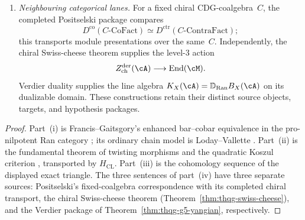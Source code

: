 \begin{proposition}
\begin{enumerate}[label=\textup{(\roman*)}]
\item \emph{Neighbouring categorical lanes.}
 For a fixed chiral CDG-coalgebra~$C$, the completed Positselski
 package compares
 \[
 D^{\mathrm{co}}(C\text{-}\mathrm{CoFact})
 \simeq D^{\mathrm{ctr}}(C\text{-}\mathrm{ContraFact});
 \]
 this transports module presentations over the same~$C$.
 Independently, the chiral Swiss-cheese theorem supplies the
 level-$3$ action
 \[
 Z^{\mathrm{der}}_{\mathrm{ch}}(\cA)
 \longrightarrow\operatorname{End}(\cM).
 \]
 Verdier duality supplies the line algebra
 $K_X(\cA)=\mathbb D_{\operatorname{Ran}}B_X(\cA)$ on its dualizable
 domain.  These constructions retain their distinct source objects,
 targets, and hypothesis packages.
\end{enumerate}
\end{proposition}

\begin{proof}
Part~\textup{(i)} is Francis--Gaitsgory's enhanced bar--cobar
equivalence in the pro-nilpotent Ran category
\cite[Proposition~4.1.2, together with the pro-nilpotence argument in
the proof of Theorem~5.1.1]{Francis2012}; its ordinary
chain model is Loday--Vallette
\cite[Corollary~2.3.4]{LV12}.  Part~\textup{(ii)} is the fundamental
theorem of twisting morphisms and the quadratic Koszul criterion
\cite[Theorems~2.3.2 and~3.4.6]{LV12}, transported by
$H_{\mathrm{CL}}$.  Part~\textup{(iii)} is the cohomology sequence of
the displayed exact triangle.  The three sentences of
part~\textup{(iv)} have three separate sources: Positselski's
fixed-coalgebra correspondence
\cite[Theorem~5.2]{Positselski11} with its completed chiral transport,
the chiral Swiss-cheese theorem
(Theorem~\ref{thm:thqg-swiss-cheese}), and the Verdier package of
Theorem~\ref{thm:thqg-g5-yangian}, respectively.
\end{proof}

